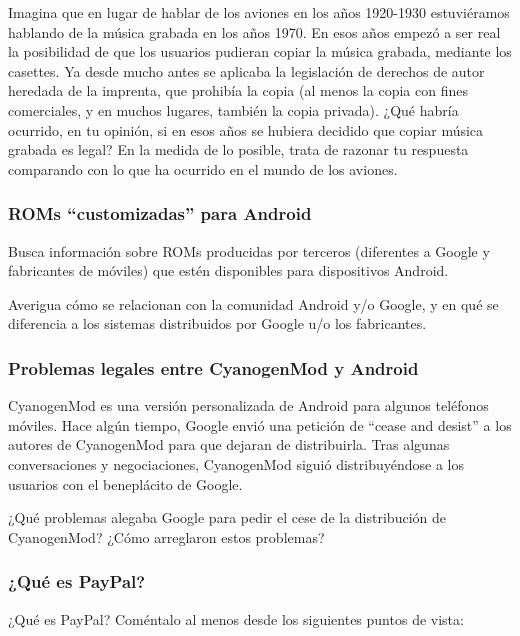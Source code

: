\documentclass[a4paper,12pt]{article}
\begin{document}
Imagina que en lugar de hablar de los aviones en los años 1920-1930 estuviéramos hablando de la música grabada en los años 1970. En esos años empezó a ser real la posibilidad de que los usuarios pudieran copiar la música grabada, mediante los casettes. Ya desde mucho antes se aplicaba la legislación de derechos de autor heredada de la imprenta, que prohibía la copia (al menos la copia con fines comerciales, y en muchos lugares, también la copia privada). ¿Qué habría ocurrido, en tu opinión, si en esos años se hubiera decidido que copiar música grabada es legal? En la medida de lo posible, trata de razonar tu respuesta comparando con lo que ha ocurrido en el mundo de los aviones.

\subsubsection{ROMs ``customizadas'' para Android}
\label{sec:roms-cust-para}

Busca información sobre ROMs producidas por terceros (diferentes a
Google y fabricantes de móviles) que estén disponibles para
dispositivos Android.

Averigua cómo se relacionan con la comunidad Android y/o Google, y en
qué se diferencia a los sistemas distribuidos por Google u/o los
fabricantes.

\subsubsection{Problemas legales entre CyanogenMod y Android}
\label{sec:probl-legal-entre}

CyanogenMod es una versión personalizada de Android para algunos
teléfonos móviles. Hace algún tiempo, Google envió una petición de
``cease and desist'' a los autores de CyanogenMod para que dejaran de
distribuirla. Tras algunas conversaciones y negociaciones, CyanogenMod
siguió distribuyéndose a los usuarios con el beneplácito de Google.

¿Qué problemas alegaba Google para pedir el cese de la distribución de
CyanogenMod? ¿Cómo arreglaron estos problemas?

\subsubsection{¿Qué es PayPal?}
\label{sub:paypal-quees}

¿Qué es PayPal? Coméntalo al menos desde los siguientes puntos de vista:
\end{document}
